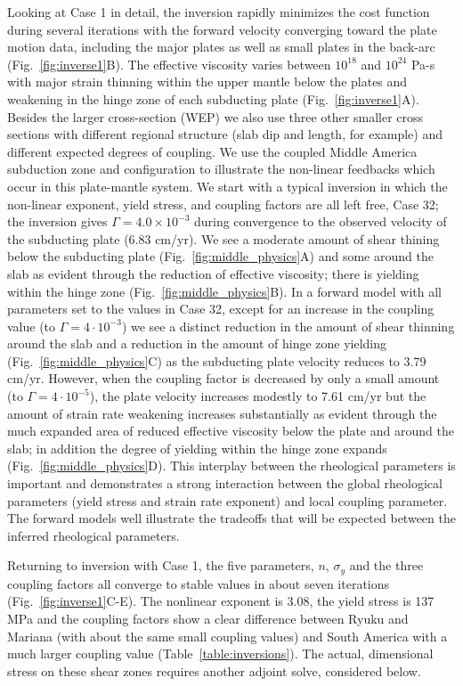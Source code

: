 \documentclass[12pt]{article}
\begin{document}
{Looking at Case 1 in detail, the inversion rapidly minimizes the 
cost function during several iterations with the forward velocity converging toward the plate motion data,
including the major plates as well as small plates in the back-arc (Fig.~\ref{fig:inverse1}B).
The effective viscosity varies between $10^{18}$ and $10^{24}$ Pa-s with major strain thinning within the upper mantle below the plates and weakening in the hinge zone of each subducting plate (Fig.~\ref{fig:inverse1}A).
Besides the larger cross-section (WEP) we also use three other smaller cross sections with different regional structure (slab dip and length, for example) and different expected degrees of coupling. 
We use the coupled Middle America subduction zone and configuration to illustrate the non-linear feedbacks which occur in this plate-mantle system.
We start with a typical inversion in which the non-linear exponent, yield stress, and coupling factors are all left free, Case 32; the inversion gives $\Gamma=4.0\times10^{-3}$ during convergence to the observed velocity of the subducting plate (6.83 cm/yr). 
We see a moderate amount of shear thining below the subducting plate (Fig.~\ref{fig:middle_physics}A) and some around the slab as evident through the reduction of effective viscosity; there is yielding within the hinge zone (Fig.~\ref{fig:middle_physics}B).
In a forward model with all parameters set to the values in Case 32, except for an increase in the coupling value
(to $\Gamma=4\cdot 10^{-3}$) we see a distinct reduction in the amount of shear thinning around the slab and a reduction in the amount of hinge zone yielding (Fig.~\ref{fig:middle_physics}C) as the subducting plate velocity 
reduces to 3.79 cm/yr.
However, when the coupling factor is decreased by only a small amount (to $\Gamma=4\cdot 10^{-5}$), the plate velocity increases modestly to 7.61 cm/yr  but the amount of strain rate weakening increases substantially as evident through the much expanded area of reduced effective viscosity below the plate and around the slab; in addition the degree of yielding within the hinge zone expands (Fig.~\ref{fig:middle_physics}D). This interplay between the rheological parameters is important and demonstrates a strong interaction between the global rheological parameters (yield stress and strain rate exponent) and local coupling parameter.
The forward models well illustrate the tradeoffs that will be expected between the inferred rheological parameters.


 Returning to inversion with Case 1, the five parameters, $n$, $\sigma_y$ and the three coupling factors all converge to stable values in about seven iterations (Fig.~\ref{fig:inverse1}C-E).
The nonlinear exponent is 3.08, the yield stress is 137 MPa and the coupling factors show a clear difference between  Ryuku and Mariana (with about the same small coupling values) and South America with a much larger coupling value (Table~\ref{table:inversions}). The actual, dimensional stress on these shear zones requires another adjoint solve, considered below.
 

}
\end{document}
